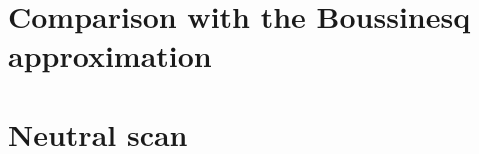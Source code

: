 \documentclass[12pt,a4paper,oneside,openright]{report} %
\begin{document}
\chapter{Comparison with the Boussinesq approximation}

\chapter{Neutral scan}


% 
%
% 
%
% 
%
% 
%
% 
%
% 
%
% 
%
\end{document}
